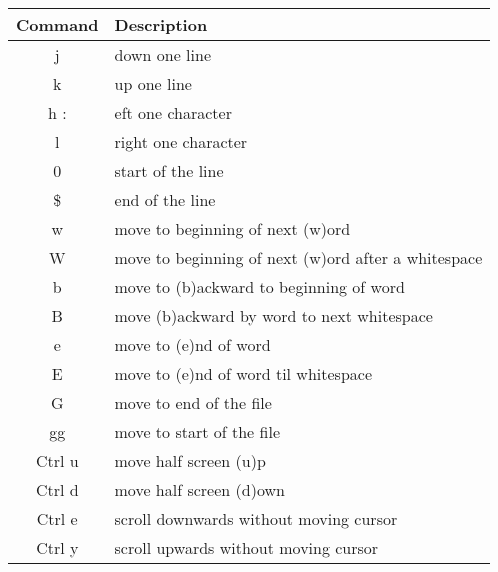 \documentclass[12pt, letterpaper]{article}
\begin{document}
\begin{table}[H]
    \begin{tabular}{|c|p{9cm}|}
        Command & Description \\
        \hline
        j & down one line \\
        \hline
        k & up one line \\
        \hline

        h : &eft one character \\
        \hline

        l & right one character \\
        \hline

        0 & start of the line \\
        \hline

        \$ & end of the line \\
        \hline

        w & move to beginning of next (w)ord \\
        \hline

        W & move to beginning of next (w)ord after a whitespace \\
        \hline

        b & move to (b)ackward to beginning of word  \\
        \hline

        B & move (b)ackward by word to next whitespace \\
        \hline

        e & move to (e)nd of word \\
        \hline

        E & move to (e)nd of word til whitespace \\
        \hline

        G & move to end of the file \\
        \hline

        gg & move to start of the file \\
        \hline

        Ctrl u & move half screen (u)p \\
        \hline

        Ctrl d & move half screen (d)own \\
        \hline

        Ctrl e & scroll downwards without moving cursor \\
        \hline

        Ctrl y & scroll upwards without moving cursor \\
        \hline


\end{tabular}
\end{table}
\end{document}
